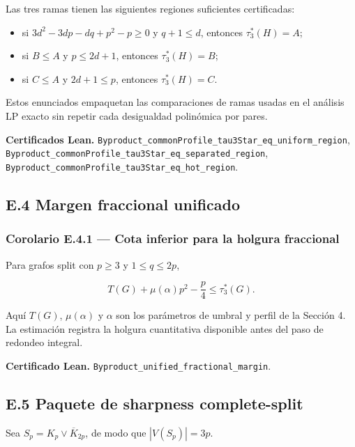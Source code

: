 \documentclass[
  spanish,
  11pt,
  a4paper,
]{article}
\providecommand{\tightlist}{%
  \setlength{\itemsep}{0pt}\setlength{\parskip}{0pt}}
\begin{document}
Las tres ramas tienen las siguientes regiones suficientes certificadas:

\begin{itemize}
\tightlist
\item
  si \(3d^2-3dp-dq+p^2-p\ge0\) y \(q+1\le d\), entonces \(\tau_3^*(H)=A\);
\item
  si \(B\le A\) y \(p\le2d+1\), entonces \(\tau_3^*(H)=B\);
\item
  si \(C\le A\) y \(2d+1\le p\), entonces \(\tau_3^*(H)=C\).
\end{itemize}

Estos enunciados empaquetan las comparaciones de ramas usadas en el análisis LP exacto sin repetir cada desigualdad polinómica por pares.

\textbf{Certificados Lean.} \texttt{Byproduct\_commonProfile\_tau3Star\_eq\_uniform\_region}, \texttt{Byproduct\_commonProfile\_tau3Star\_eq\_separated\_region}, \texttt{Byproduct\_commonProfile\_tau3Star\_eq\_hot\_region}.

\subsection{E.4 Margen fraccional unificado}\label{e.4-margen-fraccional-unificado}

\subsubsection{Corolario E.4.1 --- Cota inferior para la holgura fraccional}\label{corolario-e.4.1-cota-inferior-para-la-holgura-fraccional}

Para grafos split con \(p\ge3\) y \(1\le q\le2p\),

\[T(G)+\mu(\alpha)p^2-\frac p4\le\tau_3^*(G).\]

Aquí \(T(G)\), \(\mu(\alpha)\) y \(\alpha\) son los parámetros de umbral y perfil de la Sección 4. La estimación registra la holgura cuantitativa disponible antes del paso de redondeo integral.

\textbf{Certificado Lean.} \texttt{Byproduct\_unified\_fractional\_margin}.

\subsection{E.5 Paquete de sharpness complete-split}\label{e.5-paquete-de-sharpness-complete-split}

Sea \(S_p=K_p\vee\overline K_{2p}\), de modo que \(|V(S_p)|=3p\).
\end{document}
